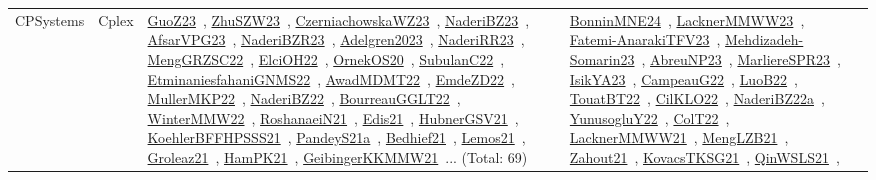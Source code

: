 {\begin{longtable}{lp{3cm}>{\raggedright\arraybackslash}p{6cm}>{\raggedright\arraybackslash}p{6cm}>{\raggedright\arraybackslash}p{8cm}}
\index{Cplex}\index{CPSystems!Cplex}CPSystems & Cplex & \href{../works/GuoZ23.pdf}{GuoZ23}~\cite{GuoZ23}, \href{../works/ZhuSZW23.pdf}{ZhuSZW23}~\cite{ZhuSZW23}, \href{../works/CzerniachowskaWZ23.pdf}{CzerniachowskaWZ23}~\cite{CzerniachowskaWZ23}, \href{../works/NaderiBZ23.pdf}{NaderiBZ23}~\cite{NaderiBZ23}, \href{../works/AfsarVPG23.pdf}{AfsarVPG23}~\cite{AfsarVPG23}, \href{../works/NaderiBZR23.pdf}{NaderiBZR23}~\cite{NaderiBZR23}, \href{../works/Adelgren2023.pdf}{Adelgren2023}~\cite{Adelgren2023}, \href{../works/NaderiRR23.pdf}{NaderiRR23}~\cite{NaderiRR23}, \href{../works/MengGRZSC22.pdf}{MengGRZSC22}~\cite{MengGRZSC22}, \href{../works/ElciOH22.pdf}{ElciOH22}~\cite{ElciOH22}, \href{../works/OrnekOS20.pdf}{OrnekOS20}~\cite{OrnekOS20}, \href{../works/SubulanC22.pdf}{SubulanC22}~\cite{SubulanC22}, \href{../works/EtminaniesfahaniGNMS22.pdf}{EtminaniesfahaniGNMS22}~\cite{EtminaniesfahaniGNMS22}, \href{../works/AwadMDMT22.pdf}{AwadMDMT22}~\cite{AwadMDMT22}, \href{../works/EmdeZD22.pdf}{EmdeZD22}~\cite{EmdeZD22}, \href{../works/MullerMKP22.pdf}{MullerMKP22}~\cite{MullerMKP22}, \href{../works/NaderiBZ22.pdf}{NaderiBZ22}~\cite{NaderiBZ22}, \href{../works/BourreauGGLT22.pdf}{BourreauGGLT22}~\cite{BourreauGGLT22}, \href{../works/WinterMMW22.pdf}{WinterMMW22}~\cite{WinterMMW22}, \href{../works/RoshanaeiN21.pdf}{RoshanaeiN21}~\cite{RoshanaeiN21}, \href{../works/Edis21.pdf}{Edis21}~\cite{Edis21}, \href{../works/HubnerGSV21.pdf}{HubnerGSV21}~\cite{HubnerGSV21}, \href{../works/KoehlerBFFHPSSS21.pdf}{KoehlerBFFHPSSS21}~\cite{KoehlerBFFHPSSS21}, \href{../works/PandeyS21a.pdf}{PandeyS21a}~\cite{PandeyS21a}, \href{../works/Bedhief21.pdf}{Bedhief21}~\cite{Bedhief21}, \href{../works/Lemos21.pdf}{Lemos21}~\cite{Lemos21}, \href{../works/Groleaz21.pdf}{Groleaz21}~\cite{Groleaz21}, \href{../works/HamPK21.pdf}{HamPK21}~\cite{HamPK21}, \href{../works/GeibingerKKMMW21.pdf}{GeibingerKKMMW21}~\cite{GeibingerKKMMW21}... (Total: 69) & \href{../works/BonninMNE24.pdf}{BonninMNE24}~\cite{BonninMNE24}, \href{../works/LacknerMMWW23.pdf}{LacknerMMWW23}~\cite{LacknerMMWW23}, \href{../works/Fatemi-AnarakiTFV23.pdf}{Fatemi-AnarakiTFV23}~\cite{Fatemi-AnarakiTFV23}, \href{../works/Mehdizadeh-Somarin23.pdf}{Mehdizadeh-Somarin23}~\cite{Mehdizadeh-Somarin23}, \href{../works/AbreuNP23.pdf}{AbreuNP23}~\cite{AbreuNP23}, \href{../works/MarliereSPR23.pdf}{MarliereSPR23}~\cite{MarliereSPR23}, \href{../works/IsikYA23.pdf}{IsikYA23}~\cite{IsikYA23}, \href{../works/CampeauG22.pdf}{CampeauG22}~\cite{CampeauG22}, \href{../works/LuoB22.pdf}{LuoB22}~\cite{LuoB22}, \href{../works/TouatBT22.pdf}{TouatBT22}~\cite{TouatBT22}, \href{../works/CilKLO22.pdf}{CilKLO22}~\cite{CilKLO22}, \href{../works/NaderiBZ22a.pdf}{NaderiBZ22a}~\cite{NaderiBZ22a}, \href{../works/YunusogluY22.pdf}{YunusogluY22}~\cite{YunusogluY22}, \href{../works/ColT22.pdf}{ColT22}~\cite{ColT22}, \href{../works/LacknerMMWW21.pdf}{LacknerMMWW21}~\cite{LacknerMMWW21}, \href{../works/MengLZB21.pdf}{MengLZB21}~\cite{MengLZB21}, \href{../works/Zahout21.pdf}{Zahout21}~\cite{Zahout21}, \href{../works/KovacsTKSG21.pdf}{KovacsTKSG21}~\cite{KovacsTKSG21}, \href{../works/QinWSLS21.pdf}{QinWSLS21}~\cite{QinWSLS21}, 
\end{longtable}}
